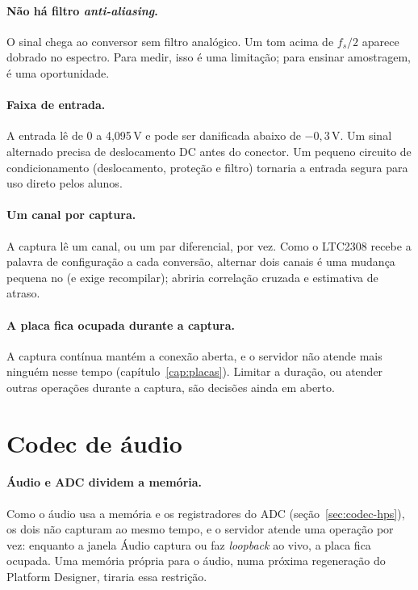 \paragraph{Não há filtro \emph{anti-aliasing}.} O sinal chega ao conversor sem
filtro analógico. Um tom acima de \(f_s/2\) aparece dobrado no espectro. Para
medir, isso é uma limitação; para ensinar amostragem, é uma oportunidade.

\paragraph{Faixa de entrada.} A entrada lê de 0 a 4,095\,V e pode ser danificada
abaixo de \(-0{,}3\)\,V. Um sinal alternado precisa de deslocamento DC antes do
conector. Um pequeno circuito de condicionamento (deslocamento, proteção e
filtro) tornaria a entrada segura para uso direto pelos alunos.

\paragraph{Um canal por captura.} A captura lê um canal, ou um par
diferencial, por vez. Como o LTC2308 recebe a palavra de configuração a cada
conversão, alternar dois canais é uma mudança pequena no 
(e exige recompilar); abriria correlação cruzada e estimativa de atraso.

\paragraph{A placa fica ocupada durante a captura.} A captura contínua mantém
a conexão aberta, e o servidor não atende mais ninguém nesse tempo
(capítulo~\ref{cap:placas}). Limitar a duração, ou atender outras operações
durante a captura, são decisões ainda em aberto.

\section{Codec de áudio}

\paragraph{Áudio e ADC dividem a memória.} Como o áudio usa a memória e os
registradores do ADC (seção~\ref{sec:codec-hps}), os dois não capturam ao
mesmo tempo, e o servidor atende uma operação por vez: enquanto a janela Áudio
captura ou faz \emph{loopback} ao vivo, a placa fica ocupada. Uma memória
própria para o áudio, numa próxima regeneração do Platform Designer, tiraria
essa restrição.

